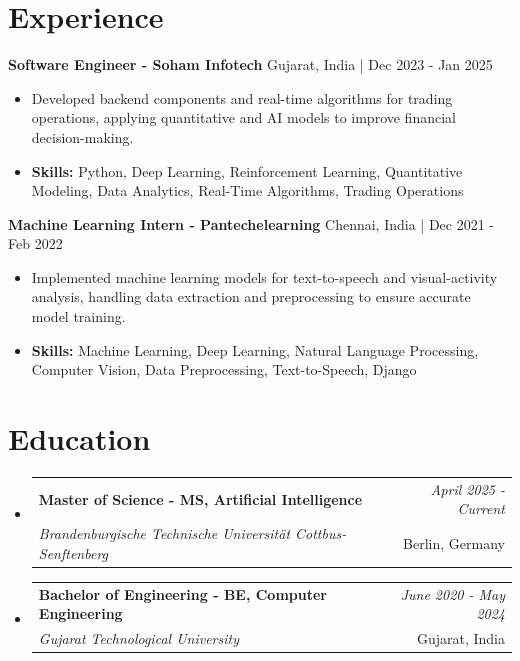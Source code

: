 \documentclass[a4paper,11pt]{article}
\makeatletter
\newcommand{\resumeSubheading}[4]{
\vspace{0.5mm}\item
    \begin{tabular*}{\linewidth}[t]{l@{\extracolsep{\fill}}r}
        \textbf{#1} & \textit{\footnotesize{#4}} \\
        \textit{\footnotesize{#3}} &  \footnotesize{#2}\\
    \end{tabular*}
    \vspace{-2.4mm}
}
\makeatother
\begin{document}
\section{\textbf{Experience}}


\vspace{1mm}
  \textbf{Software Engineer - Soham Infotech} \hfill Gujarat, India | Dec 2023 - Jan 2025
\vspace{-1.5mm} %
\begin{itemize}
  \item Developed backend components and real-time algorithms for trading operations, applying quantitative and AI models to improve financial decision-making.

\vspace{-2mm}
  \item \textbf{Skills:} Python, Deep Learning, Reinforcement Learning, Quantitative Modeling, Data Analytics, Real-Time Algorithms, Trading Operations
\end{itemize}

\vspace{1mm}
  \textbf{Machine Learning Intern - Pantechelearning} \hfill Chennai, India | Dec 2021 - Feb 2022
\vspace{-1.5mm} %
\begin{itemize}
  \item Implemented machine learning models for text-to-speech and visual-activity analysis, handling data extraction and preprocessing to ensure accurate model training.
\vspace{-2mm}
  \item \textbf{Skills:} Machine Learning, Deep Learning, Natural Language Processing, Computer Vision, Data Preprocessing, Text-to-Speech, Django
\end{itemize}\section{\textbf{Education}}
\vspace{-0.4mm}

\begin{itemize}[leftmargin=0.15in, label={}]
\resumeSubheading
{Master of Science - MS, Artificial Intelligence }{Berlin, Germany}
{Brandenburgische Technische Universität Cottbus-Senftenberg  }{April 2025 - Current}

\vspace{1.0mm} %
\resumeSubheading
{Bachelor of Engineering - BE, Computer Engineering  }{Gujarat, India}
{Gujarat Technological University }{June 2020 - May 2024}

\end{itemize}
\end{document}
